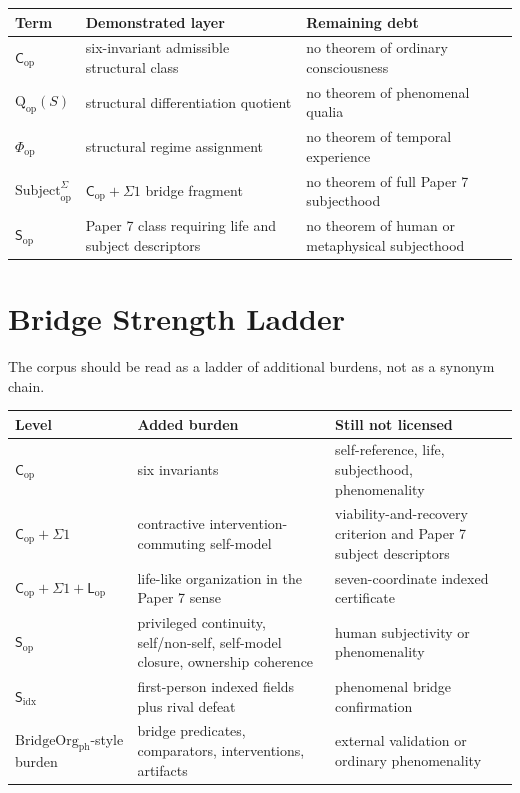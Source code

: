 \documentclass[11pt,a4paper]{article}
\theoremstyle{definition}
\newcommand{\Cop}{\mathsf{C}_{\mathrm{op}}}
\newcommand{\Subop}{\mathsf{S}_{\mathrm{op}}}
\newcommand{\Subfp}{\mathsf{S}_{\mathrm{idx}}}
\newcommand{\Subbridge}{\mathrm{Subject}^{\Sigma}_{\mathrm{op}}}
\newcommand{\Lop}{\mathsf{L}_{\mathrm{op}}}
\newcommand{\Qop}{\mathrm{Q}_{\mathrm{op}}}
\newcommand{\Phiop}{\Phi_{\mathrm{op}}}
\begin{document}
\begin{center}
\small
\renewcommand{\arraystretch}{1.16}
\begin{tabularx}{\linewidth}{@{}lY Y@{}}
\toprule
Term & Demonstrated layer & Remaining debt \\
\midrule
$\Cop$ & six-invariant admissible structural class & no theorem of ordinary consciousness \\
$\Qop(S)$ & structural differentiation quotient & no theorem of phenomenal qualia \\
$\Phiop$ & structural regime assignment & no theorem of temporal experience \\
$\Subbridge$ & $\Cop+\Sigma1$ bridge fragment & no theorem of full Paper 7 subjecthood \\
$\Subop$ & Paper 7 class requiring life and subject descriptors & no theorem of human or metaphysical subjecthood \\
\bottomrule
\end{tabularx}
\end{center}

\section{Bridge Strength Ladder}

The corpus should be read as a ladder of additional burdens, not as a synonym
chain.

\begin{center}
\small
\renewcommand{\arraystretch}{1.16}
\begin{tabularx}{\linewidth}{@{}lY Y@{}}
\toprule
Level & Added burden & Still not licensed \\
\midrule
$\Cop$ & six invariants & self-reference, life, subjecthood, phenomenality \\
$\Cop+\Sigma1$ & contractive intervention-commuting self-model & viability-and-recovery criterion and Paper 7 subject descriptors \\
$\Cop+\Sigma1+\Lop$ & life-like organization in the Paper 7 sense & seven-coordinate indexed certificate \\
$\Subop$ & privileged continuity, self/non-self, self-model closure, ownership coherence & human subjectivity or phenomenality \\
$\Subfp$ & first-person indexed fields plus rival defeat & phenomenal bridge confirmation \\
$\mathrm{BridgeOrg}_{\mathrm{ph}}$-style burden & bridge predicates, comparators, interventions, artifacts & external validation or ordinary phenomenality \\
\bottomrule
\end{tabularx}
\end{center}
\end{document}
